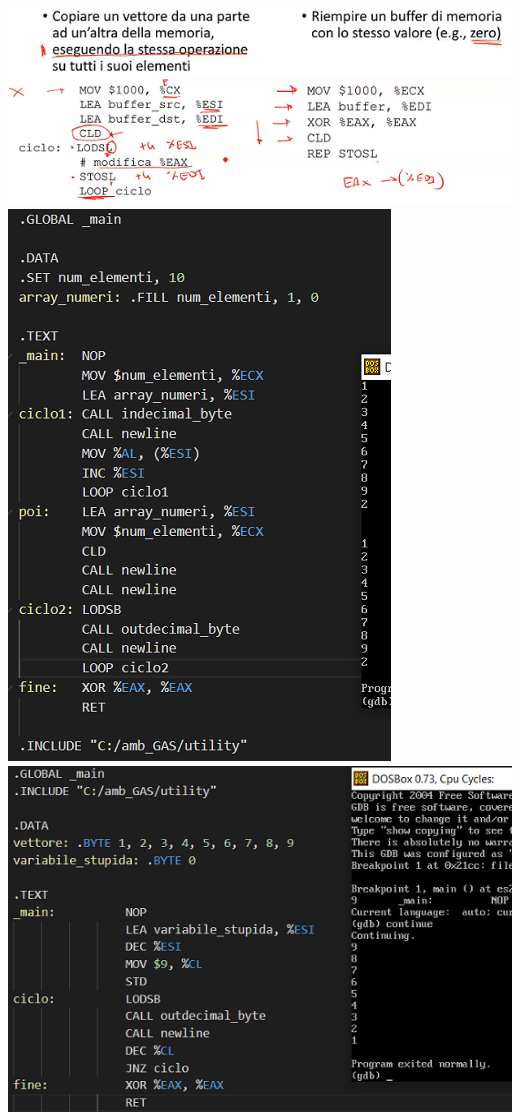 \documentclass[11pt]{report}
\begin{document}
\begin{center}
\includegraphics{img/60.PNG}
\includegraphics{img/223.PNG}
\includegraphics{img/240.PNG}
\end{center}
\end{document}

